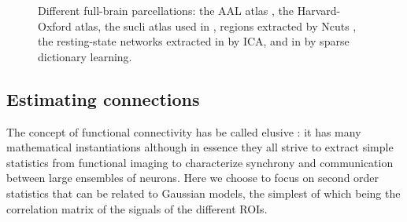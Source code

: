 \documentclass[5p]{elsarticle}
\begin{document}
\begin{figure}
\caption{
Different full-brain parcellations: the AAL atlas
\cite{tzourio-mazoyer2002a}, the Harvard-Oxford atlas, the sucli atlas used in
\cite{varoquaux2010c}, regions extracted by Ncuts
\cite{craddock2011}, the resting-state networks extracted in
\cite{smith2009} by ICA, and in \cite{varoquaux2011} by sparse dictionary
learning.
\label{fig:parcellations}
}
\end{figure}

\subsection{Estimating connections}

The concept of functional connectivity has be called elusive
\cite{horwitz2003}: it has many mathematical instantiations although in
essence they all strive to extract simple statistics from functional
imaging to characterize synchrony and communication between large
ensembles of neurons. Here we choose to focus on second order statistics
that can be related to Gaussian models, the simplest of which being the
correlation matrix of the signals of the different ROIs.
\end{document}

